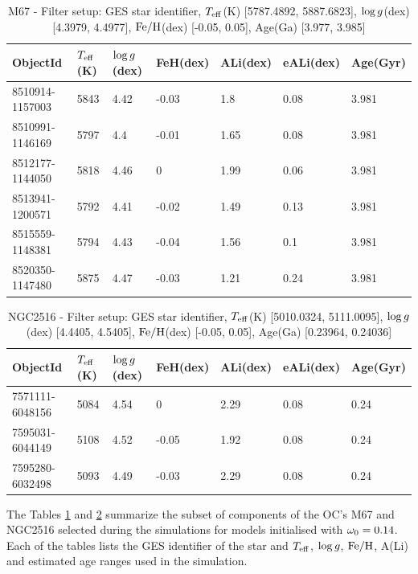 \documentclass[fleqn,usenatbib]{mnras}
\begin{document}
\begin{table}
	\centering
	\begin{tabular}{l l l l l l l} 
		\hline
            ObjectId & $T_{\mathrm{eff}}$(K) & $\mathrm{log} \, g$(dex) & FeH(dex) & ALi(dex) & eALi(dex) & Age(Gyr)\\
		\hline
            8510914-1157003 & 5843 & 4.42 & -0.03 & 1.8 & 0.08 & 3.981\\ 
            8510991-1146169 & 5797 & 4.4 & -0.01 & 1.65 & 0.08 & 3.981\\ 
            8512177-1144050 & 5818 & 4.46 & 0 & 1.99 & 0.06 & 3.981\\ 
            8513941-1200571 & 5792 & 4.41 & -0.02 & 1.49 & 0.13 & 3.981\\ 
            8515559-1148381 & 5794 & 4.43 & -0.04 & 1.56 & 0.1 & 3.981\\ 
            8520350-1147480 & 5875 & 4.47 & -0.03 & 1.21 & 0.24 & 3.981\\ 
            \hline
	\end{tabular}
 	\caption{M67 - Filter setup: GES star identifier, $T_{\mathrm{eff}}$(K) [5787.4892, 5887.6823], $\mathrm{log} \, g$(dex) [4.3979, 4.4977], $\mathrm{Fe}/\mathrm{H}$(dex) [-0.05, 0.05], Age(Ga) [3.977, 3.985]}
	\label{tab:oc_m67}
\end{table}

\begin{table}
	\centering
	\begin{tabular}{l l l l l l l} 
		\hline
            ObjectId & $T_{\mathrm{eff}}$(K) & $\mathrm{log} \, g$(dex) & FeH(dex) & ALi(dex) & eALi(dex) & Age(Gyr)\\
		\hline
            7571111-6048156 & 5084 & 4.54 & 0 & 2.29 & 0.08 & 0.24\\ 
            7595031-6044149 & 5108 & 4.52 & -0.05 & 1.92 & 0.08 & 0.24\\ 
            7595280-6032498 & 5093 & 4.49 & -0.03 & 2.29 & 0.08 & 0.24\\ 
            \hline
	\end{tabular}
 	\caption{NGC2516 - Filter setup: GES star identifier, $T_{\mathrm{eff}}$(K) [5010.0324, 5111.0095], $\mathrm{log} \, g$(dex) [4.4405, 4.5405], $\mathrm{Fe}/\mathrm{H}$(dex) [-0.05, 0.05], Age(Ga) [0.23964, 0.24036]}\label{tab:oc_ngc2516}

\end{table}



The Tables \ref{tab:oc_m67} and \ref{tab:oc_ngc2516} summarize the subset of components of the OC's M67 and NGC2516 selected during the simulations for models initialised with $\omega_{\mathrm{0}} = 0.14$. Each of the tables lists the GES identifier of the star and $T_{\mathrm{eff}}$, $\mathrm{log} \, g$, $\mathrm{Fe}/\mathrm{H}$, A(Li) and estimated age ranges used in the simulation.
\end{document}
